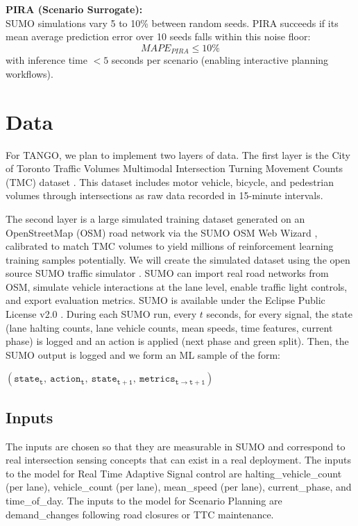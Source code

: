 \documentclass[10pt,twocolumn]{article}
\begin{document}
\textbf{PIRA (Scenario Surrogate):}\\
SUMO simulations vary 5 to 10\% between random seeds. PIRA succeeds if its mean average prediction error over 10 seeds falls within this noise floor:
\begin{equation*}
    MAPE_{PIRA} \leq 10\%
\end{equation*}
with inference time $<5$ seconds per scenario (enabling interactive planning workflows).

\section{Data}
For TANGO, we plan to implement two layers of data. The first layer is the City of Toronto Traffic Volumes Multimodal Intersection Turning Movement Counts (TMC) dataset \cite{udc_tmc}. This dataset includes motor vehicle, bicycle, and pedestrian volumes through intersections as raw data recorded in 15-minute intervals.

The second layer is a large simulated training dataset generated on an OpenStreetMap (OSM) road network via the SUMO OSM Web Wizard \cite{sumo_osm_wizard}, calibrated to match TMC volumes to yield millions of reinforcement learning training samples potentially. We will create the simulated dataset using the open source SUMO traffic simulator \cite{sumo_home}. SUMO can import real road networks from OSM, simulate vehicle interactions at the lane level, enable traffic light controls, and export evaluation metrics. SUMO is available under the Eclipse Public License v2.0 \cite{epl2}. During each SUMO run, every $t$ seconds, for every signal, the state (lane halting counts, lane vehicle counts, mean speeds, time features, current phase) is logged and an action is applied (next phase and green split). Then, the SUMO output is logged and we form an ML sample of the form:

\noindent\hspace*{3em}$\mathtt{(state_t,\ action_t,\ state_{t+1},\ metrics_{t \to t+1})}$


\subsection{Inputs}
The inputs are chosen so that they are measurable in SUMO and correspond to real intersection sensing concepts that can exist in a real deployment. The inputs to the model for Real Time Adaptive Signal control are halting\_vehicle\_count (per lane), vehicle\_count (per lane), mean\_speed (per lane), current\_phase, and time\_of\_day. The inputs to the model for Scenario Planning are demand\_changes following road closures or TTC maintenance.
\end{document}
